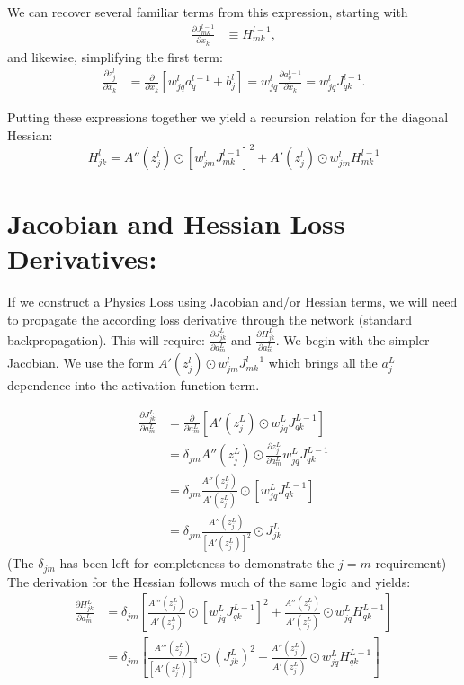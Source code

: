 \documentclass{article}
\begin{document}
We can recover several familiar terms from this expression, starting with
\begin{align}
\frac{\partial J_{mk}^{l-1}}{\partial x_k} &\equiv H_{mk}^{l-1},
\end{align}
\indent and likewise, simplifying the first term:
\begin{align}
\frac{\partial z_j^l}{\partial x_k} 
&= \frac{\partial}{\partial x_k} \left[ w_{jq}^l a_q^{l-1} + b_j^l \right]
= w_{jq}^l \frac{\partial a_q^{l-1}}{\partial x_k}
= w_{jq}^l J_{qk}^{l-1}.
\end{align}

Putting these expressions together we yield a recursion relation for the diagonal Hessian:
\begin{equation}
H_{jk}^l = A''(z_j^l) \odot \left[ w_{jm}^l J_{mk}^{l-1} \right]^2 + A'(z_j^l) \odot w_{jm}^l H_{mk}^{l-1}
\end{equation}


\section*{Jacobian and Hessian Loss Derivatives:}
If we construct a Physics Loss using Jacobian and/or Hessian terms, we will need to propagate the according loss derivative through the network (standard backpropagation). This will require: \(\frac{\partial J_{jk}^L}{\partial a_m^L}\) and \(\frac{\partial H_{jk}^L}{\partial a_m^L}\). We begin with the simpler Jacobian. We use the form \(A'(z_j^l) \odot w_{jm}^l J_{mk}^{l-1}\) which brings all the \(a_j^L\) dependence into the activation function term.

\begin{align}
\frac{\partial J_{jk}^L}{\partial a_m^L} &= \frac{\partial}{\partial a_m^L} \left[ A'(z_j^L) \odot w_{jq}^L J_{qk}^{L-1} \right] \\
&= \delta_{jm} A''(z_j^L) \odot \frac{\partial z_j^L}{\partial a_m^L} w_{jq}^L J_{qk}^{L-1} \\
&= \delta_{jm} \frac{A''(z_j^L)}{A'(z_j^L)} \odot \left[w_{jq}^L J_{qk}^{L-1} \right] \\
&= \delta_{jm} \frac{A''(z_j^L)}{[A'(z_j^L)]^2} \odot J_{jk}^L
\end{align}
(The \(\delta_{jm}\) has been left for completeness to demonstrate the \(j=m\) requirement) \\

The derivation for the Hessian follows much of the same logic and yields:
\begin{align}
\frac{\partial H_{jk}^L}{\partial a_m^L} &= \delta_{jm} \left[ \frac{A'''(z_j^L)}{A'(z_j^L)} \odot \left[w_{jq}^L J_{qk}^{L-1} \right]^2 + \frac{A''(z_j^L)}{A'(z_j^L)} \odot w_{jq}^L H_{qk}^{L-1} \right] \\
&= \delta_{jm} \left[ \frac{A'''(z_j^L)}{[A'(z_j^L)]^3} \odot (J_{jk}^L)^2 + \frac{A''(z_j^L)}{A'(z_j^L)} \odot w_{jq}^L H_{qk}^{L-1} \right]
\end{align}
\end{document}
